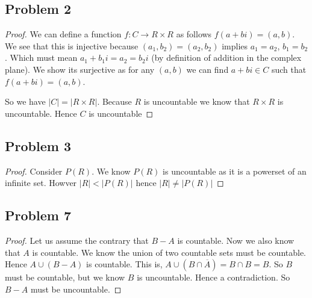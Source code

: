 \documentclass[a4paper]{report}
\begin{document}
\subsection*{Problem 2}
\begin{proof}
    We can define a function $f: C \rightarrow R \times R$ as follows $f(a + bi) = (a,b)$. We see that  this is injective because $(a_1,b_2) = (a_2,b_2)$ implies $a_1 = a_2$, $b_1 = b_2$. Which must mean $a_1 + b_1i = a_2 = b_2 i$ (by definition of addition in the complex plane). We show its surjective as for any $(a,b)$ we can find  $a + bi \in C$ such that $f(a + bi) = (a,b)$. 

    So we have $|C| = |R \times  R|$. Because $R $ is uncountable we know that $R \times  R$ is uncountable. Hence $C$ is uncountable


\end{proof}


\subsection*{Problem 3}
\begin{proof}
    Consider $P(R)$. We know $P(R)$ is uncountable as it is a powerset of an infinite set. Howver $|R| < |P(R)|$ hence $|R| \ne |P(R)|$
\end{proof}
\subsection*{Problem 7}
\begin{proof}
    Let us assume the contrary that $B - A$ is countable. Now we also know that $A $ is countable. We know the union of two countable sets must be countable. Hence $A \cup (B - A)$ is countable. This is, $A \cup (B \cap \overline{A}) = B \cap B = B$. So $B$ must be countable, but we know $B$ is uncountable. Hence a contradiction. So $B - A$ must be uncountable.
\end{proof}
\end{document}
